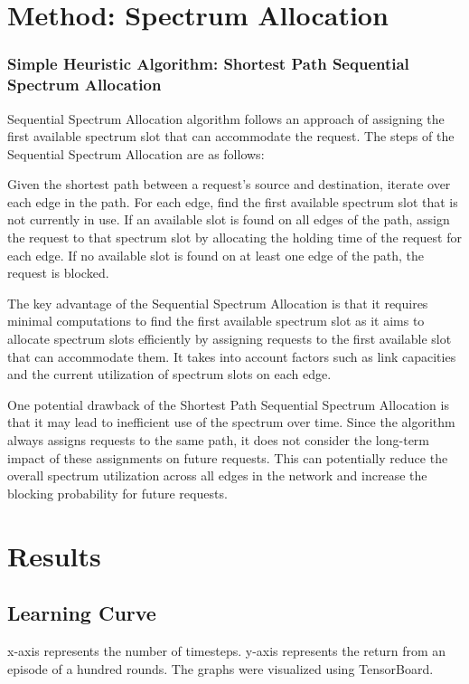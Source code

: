 \documentclass[conference]{IEEEtran}
\begin{document}
\section{Method: Spectrum Allocation}
\subsubsection{Simple Heuristic Algorithm: Shortest Path Sequential Spectrum Allocation}
Sequential Spectrum Allocation algorithm follows an approach of assigning the first available spectrum slot that can accommodate the request.
The steps of the Sequential Spectrum Allocation are as follows:

Given the shortest path between a request's source and destination, iterate over each edge in the path.
For each edge, find the first available spectrum slot that is not currently in use.
If an available slot is found on all edges of the path, assign the request to that spectrum slot by allocating the holding time of the request for each edge.
If no available slot is found on at least one edge of the path, the request is blocked.

The key advantage of the Sequential Spectrum Allocation is that it requires minimal computations to find the first available spectrum slot as it aims to allocate spectrum slots efficiently by assigning requests to the first available slot that can accommodate them. It takes into account factors such as link capacities and the current utilization of spectrum slots on each edge.

One potential drawback of the Shortest Path Sequential Spectrum Allocation is that it may lead to inefficient use of the spectrum over time. Since the algorithm always assigns requests to the same path, it does not consider the long-term impact of these assignments on future requests. This can potentially reduce the overall spectrum utilization across all edges in the network and increase the blocking probability for future requests.


\section{Results}
\subsection{Learning Curve}
x-axis represents the number of timesteps. y-axis represents the return from an episode of a hundred rounds. The graphs were visualized using TensorBoard. 
\end{document}
